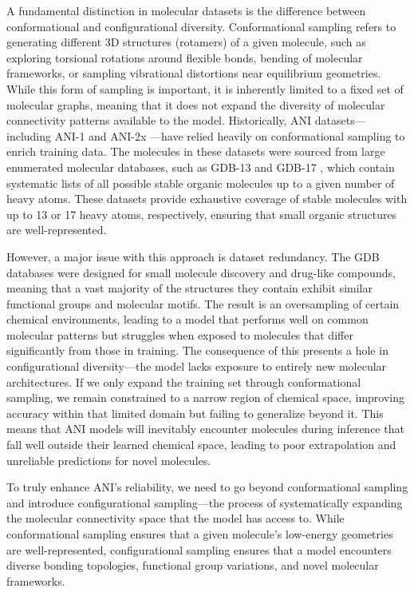 A fundamental distinction in molecular datasets is the difference between conformational and configurational diversity. Conformational sampling refers to generating different 3D structures (rotamers) of a given molecule, such as exploring torsional rotations around flexible bonds, bending of molecular frameworks, or sampling vibrational distortions near equilibrium geometries. While this form of sampling is important, it is inherently limited to a fixed set of molecular graphs, meaning that it does not expand the diversity of molecular connectivity patterns available to the model. Historically, ANI datasets—including ANI-1 \cite{ani-1} and ANI-2x \cite{ani-2x}—have relied heavily on conformational sampling to enrich training data. The molecules in these datasets were sourced from large enumerated molecular databases, such as GDB-13 \cite{gdb-13} and GDB-17 \cite{gdb-17}, which contain systematic lists of all possible stable organic molecules up to a given number of heavy atoms. These datasets provide exhaustive coverage of stable molecules with up to 13 or 17 heavy atoms, respectively, ensuring that small organic structures are well-represented.

However, a major issue with this approach is dataset redundancy. The GDB databases were designed for small molecule discovery and drug-like compounds, meaning that a vast majority of the structures they contain exhibit similar functional groups and molecular motifs. The result is an oversampling of certain chemical environments, leading to a model that performs well on common molecular patterns but struggles when exposed to molecules that differ significantly from those in training. The consequence of this presents a hole in configurational diversity—the model lacks exposure to entirely new molecular architectures. If we only expand the training set through conformational sampling, we remain constrained to a narrow region of chemical space, improving accuracy within that limited domain but failing to generalize beyond it. This means that ANI models will inevitably encounter molecules during inference that fall well outside their learned chemical space, leading to poor extrapolation and unreliable predictions for novel molecules.

To truly enhance ANI’s reliability, we need to go beyond conformational sampling and introduce configurational sampling—the process of systematically expanding the molecular connectivity space that the model has access to. While conformational sampling ensures that a given molecule’s low-energy geometries are well-represented, configurational sampling ensures that a model encounters diverse bonding topologies, functional group variations, and novel molecular frameworks.

